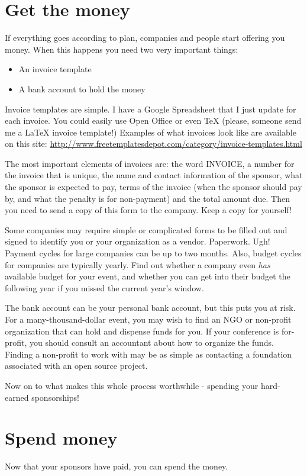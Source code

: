 \section*{Get the money}
If everything goes according to plan, companies and people start offering you
money. When this happens you need two very important things: 
\begin{itemize}
\item An invoice template
\item A bank account to hold the money
\end{itemize}

Invoice templates are simple. I have a Google Spreadsheet that I just update for
each invoice. You could easily use Open Office or even TeX (please, someone send
me a LaTeX invoice template!) Examples of what invoices look like are available
on this site:
\url{http://www.freetemplatesdepot.com/category/invoice-templates.html}

The most important elements of invoices are: the word INVOICE, a number for the
invoice that is unique, the name and contact information of the sponsor, what the
sponsor is expected to pay, terms of the invoice (when the sponsor should pay
by, and what the penalty is for non-payment) and the total amount due. Then you
need to send a copy of this form to the company. Keep a copy for yourself!

Some companies may require simple or complicated forms to be filled out and
signed to identify you or your organization as a vendor. Paperwork. Ugh! Payment
cycles for large companies can be up to two months. Also, budget cycles for
companies are typically yearly. Find out whether a company even \textit{has}
available budget for your event, and whether you can get into their budget the
following year if you missed the current year’s window.

The bank account can be your personal bank account, but this puts you at risk.
For a many-thousand-dollar event, you may wish to find an NGO or non-profit
organization that can hold and dispense funds for you. If your conference is
for-profit, you should consult an accountant about how to organize the funds.
Finding a non-profit to work with may be as simple as contacting a foundation
associated with an open source project. 

Now on to what makes this whole process worthwhile - spending your hard-earned
sponsorships!

\section*{Spend money}
Now that your sponsors have paid, you can spend the money. 

